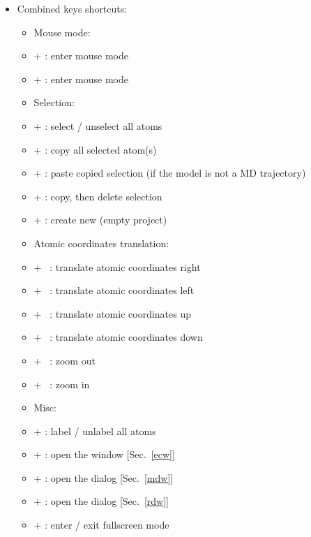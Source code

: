 {\begin{itemize}
\begin{itemize}
\item[] \Del\ : Delete all selected atom(s)
\end{itemize}
\newpage
\item Combined keys shortcuts:
\begin{itemize}
\item Mouse mode:
\item[] \Alt +  : enter mouse  mode
\item[] \Alt +  : enter mouse  mode \\
\item Selection:
\item[] \Ctrl +  : select / unselect all atoms
\item[] \Ctrl +  : copy all selected atom(s)
\item[] \Ctrl +  : paste copied selection (if the model is not a MD trajectory)
\item[] \Ctrl +  : copy, then delete selection
\item[] \Ctrl +  : create new (empty project) \\
\item Atomic coordinates translation:
\item[] \Ctrl + \RArrow\ : translate atomic coordinates right
\item[] \Ctrl + \LArrow\ : translate atomic coordinates left
\item[] \Ctrl + \UArrow\ : translate atomic coordinates up
\item[] \Ctrl + \DArrow\ : translate atomic coordinates down
\item[] \Shift + \UArrow\ : zoom out
\item[] \Shift + \DArrow\ : zoom in \\
\item Misc:
\item[] \Ctrl +  : label / unlabel all atoms 
\item[] \Ctrl +  : open the  window [Sec.~\ref{ecw}]
\item[] \Ctrl +  : open the  dialog [Sec.~\ref{mdw}]
\item[] \Ctrl +  : open the  dialog [Sec.~\ref{rdw}]
\item[] \Ctrl +  : enter / exit fullscreen mode 
\end{itemize}
\end{itemize}}

